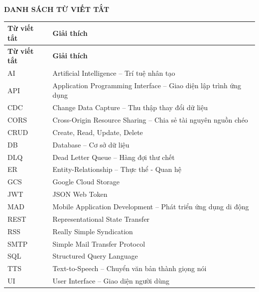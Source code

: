 \documentclass[14pt,a4paper,oneside]{extreport}
\begin{document}
\newpage
\tableofcontents

\newpage
\listoffigures

\listoftables

\newpage
\begin{center}
  {\Large\textbf{DANH SÁCH TỪ VIẾT TẮT}}
\end{center}

\vspace{0.5cm}

\begin{longtable}{l l}
  \toprule
  \textbf{Từ viết tắt} & \textbf{Giải thích} \\
  \midrule
  \endfirsthead

  \toprule
  \textbf{Từ viết tắt} & \textbf{Giải thích} \\
  \midrule
  \endhead

  AI    & Artificial Intelligence -- Trí tuệ nhân tạo \\
  API   & Application Programming Interface -- Giao diện lập trình ứng dụng \\
  CDC   & Change Data Capture -- Thu thập thay đổi dữ liệu \\
  CORS  & Cross-Origin Resource Sharing -- Chia sẻ tài nguyên nguồn chéo \\
  CRUD  & Create, Read, Update, Delete \\
  DB    & Database -- Cơ sở dữ liệu \\
  DLQ   & Dead Letter Queue -- Hàng đợi thư chết \\
  ER    & Entity-Relationship -- Thực thể - Quan hệ \\
  GCS   & Google Cloud Storage \\
  JWT   & JSON Web Token \\
  MAD   & Mobile Application Development -- Phát triển ứng dụng di động \\
  REST  & Representational State Transfer \\
  RSS   & Really Simple Syndication \\
  SMTP  & Simple Mail Transfer Protocol \\
  SQL   & Structured Query Language \\
  TTS   & Text-to-Speech -- Chuyển văn bản thành giọng nói \\
  UI    & User Interface -- Giao diện người dùng \\
  \bottomrule
\end{longtable}
\end{document}
